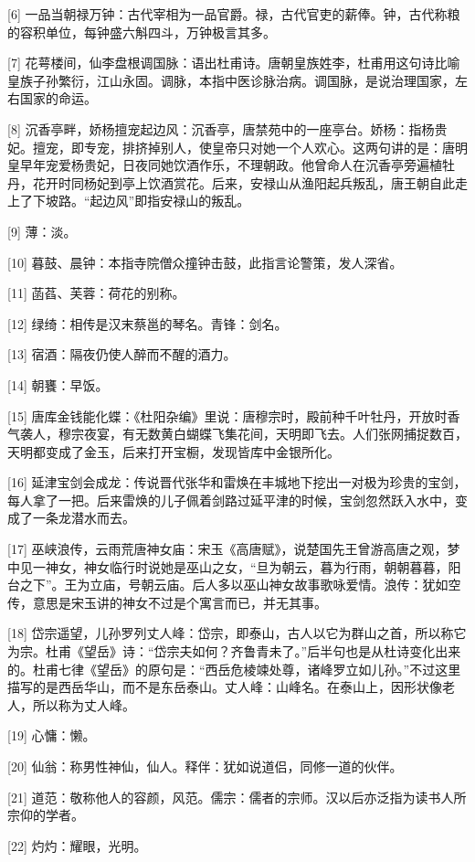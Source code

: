 \documentclass[12pt,UTF8]{ctexbook}
\begin{document}
[6] 一品当朝禄万钟：古代宰相为一品官爵。禄，古代官吏的薪俸。钟，古代称粮的容积单位，每钟盛六斛四斗，万钟极言其多。

[7] 花萼楼间，仙李盘根调国脉：语出杜甫诗。唐朝皇族姓李，杜甫用这句诗比喻皇族子孙繁衍，江山永固。调脉，本指中医诊脉治病。调国脉，是说治理国家，左右国家的命运。

[8] 沉香亭畔，娇杨擅宠起边风：沉香亭，唐禁苑中的一座亭台。娇杨：指杨贵妃。擅宠，即专宠，排挤掉别人，使皇帝只对她一个人欢心。这两句讲的是：唐明皇早年宠爱杨贵妃，日夜同她饮酒作乐，不理朝政。他曾命人在沉香亭旁遍植牡丹，花开时同杨妃到亭上饮酒赏花。后来，安禄山从渔阳起兵叛乱，唐王朝自此走上了下坡路。“起边风”即指安禄山的叛乱。

[9] 薄：淡。

[10] 暮鼓、晨钟：本指寺院僧众撞钟击鼓，此指言论警策，发人深省。

[11] 菡萏、芙蓉：荷花的别称。

[12] 绿绮：相传是汉末蔡邕的琴名。青锋：剑名。

[13] 宿酒：隔夜仍使人醉而不醒的酒力。

[14] 朝饔：早饭。

[15] 唐库金钱能化蝶：《杜阳杂编》里说：唐穆宗时，殿前种千叶牡丹，开放时香气袭人，穆宗夜宴，有无数黄白蝴蝶飞集花间，天明即飞去。人们张网捕捉数百，天明都变成了金玉，后来打开宝橱，发现皆库中金银所化。

[16] 延津宝剑会成龙：传说晋代张华和雷焕在丰城地下挖出一对极为珍贵的宝剑，每人拿了一把。后来雷焕的儿子佩着剑路过延平津的时候，宝剑忽然跃入水中，变成了一条龙潜水而去。

[17] 巫峡浪传，云雨荒唐神女庙：宋玉《高唐赋》，说楚国先王曾游高唐之观，梦中见一神女，神女临行时说她是巫山之女，“旦为朝云，暮为行雨，朝朝暮暮，阳台之下”。王为立庙，号朝云庙。后人多以巫山神女故事歌咏爱情。浪传：犹如空传，意思是宋玉讲的神女不过是个寓言而已，并无其事。

[18] 岱宗遥望，儿孙罗列丈人峰：岱宗，即泰山，古人以它为群山之首，所以称它为宗。杜甫《望岳》诗：“岱宗夫如何？齐鲁青未了。”后半句也是从杜诗变化出来的。杜甫七律《望岳》的原句是：“西岳危棱竦处尊，诸峰罗立如儿孙。”不过这里描写的是西岳华山，而不是东岳泰山。丈人峰：山峰名。在泰山上，因形状像老人，所以称为丈人峰。

[19] 心慵：懒。

[20] 仙翁：称男性神仙，仙人。释伴：犹如说道侣，同修一道的伙伴。

[21] 道范：敬称他人的容颜，风范。儒宗：儒者的宗师。汉以后亦泛指为读书人所宗仰的学者。

[22] 灼灼：耀眼，光明。
\end{document}
